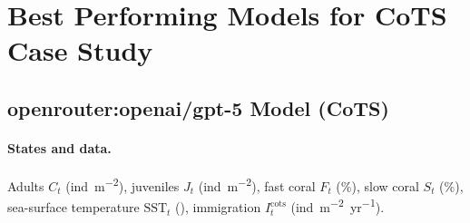 
\section{Best Performing Models for CoTS Case Study}
\label{sec:best_models_cots}

\subsection{openrouter:openai/gpt-5 Model (CoTS)}
\paragraph{States and data.}
Adults \(C_t\) (\si{ind.m^{-2}}), juveniles \(J_t\) (\si{ind.m^{-2}}), fast coral \(F_t\) (\%), slow coral \(S_t\) (\%), sea-surface temperature \(\mathrm{SST}_t\) (\si{\degreeC}), immigration \(I^{\text{cots}}_t\) (\si{ind.m^{-2}.yr^{-1}}).

